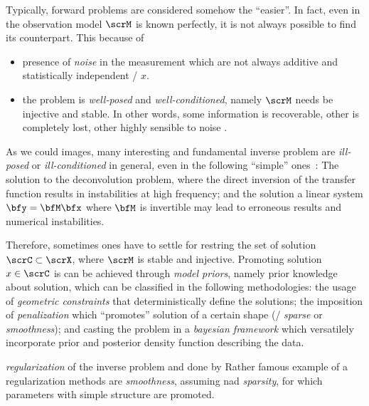 Typically, forward problems are considered somehow the ``easier''.
In fact, even in the observation model $\scrM$ is known perfectly, it is not always possible to find its counterpart.
This because of
\begin{itemize}
    \item presence of \textit{noise} in the measurement which are not always additive and statistically independent \wrt/ $x$.
    \item the problem is \textit{well-posed} and \textit{well-conditioned}, namely $\scrM$ needs be injective and stable.
    In other words, some information is recoverable, other is completely lost, other highly sensible to noise
    .
\end{itemize}

As we could images, many interesting and fundamental inverse problem are
\textit{ill-posed} or \textit{ill-conditioned} in general, even in the following ``simple'' ones~\cite{kitic2015cosparse}:
The solution to the deconvolution problem, where the direct inversion of the transfer function results in instabilities
at high frequency; and the solution a linear system $\bfy = \bfM \bfx$ where $\bfM$ is invertible
may lead to erroneous results and numerical instabilities.

Therefore, sometimes ones have to settle for restring the set of solution $\scrC \subset \scrX$,
where $\scrM$ is stable and injective.
Promoting solution $x \in \scrC$ is can be achieved through \textit{model priors}, namely prior knowledge about solution, which can
be classified in the following methodologies:
the usage of \textit{geometric constraints} that deterministically define the solutions; the imposition of \textit{penalization}
which ``promotes'' solution of a certain shape (\eg/ \textit{sparse} or \textit{smoothness});
and casting the problem in a \textit{bayesian framework} which versatilely incorporate prior and posterior density function describing the data.


\textit{regularization} of the inverse problem
and done by
Rather famous example of a regularization methods are \textit{smoothness}, assuming
nad \textit{sparsity}, for which parameters with simple structure are promoted.

